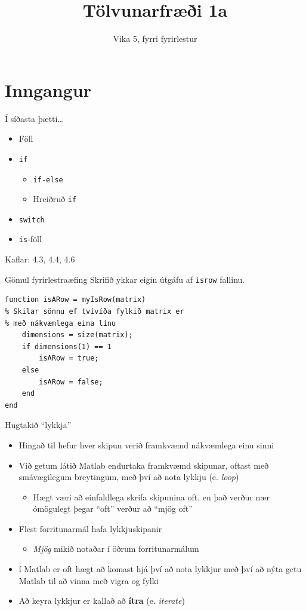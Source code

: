 \documentclass[handout]{beamer}
\title{Tölvunarfræði 1a}
\subtitle{Vika 5, fyrri fyrirlestur}
\begin{document}
\begin{frame}
\titlepage
\end{frame}

\section{Inngangur}

\begin{frame}{Í síðasta þætti\ldots}
\begin{itemize}
 \item Föll
 \item \texttt{if}
 \begin{itemize}
  \item \texttt{if-else}
  \item Hreiðruð \texttt{if}
 \end{itemize}
 \item \texttt{switch}
 \item \texttt{is}-föll
\end{itemize}
Kaflar: 4.3, 4.4, 4.6
\end{frame}

\begin{frame}[fragile]{Gömul fyrirlestraæfing}
Skrifið ykkar eigin útgáfu af \texttt{isrow} fallinu. \pause
\begin{verbatim}
function isARow = myIsRow(matrix)
% Skilar sönnu ef tvívíða fylkið matrix er 
% með nákvæmlega eina línu
    dimensions = size(matrix);
    if dimensions(1) == 1
        isARow = true;
    else
        isARow = false;
    end
end
\end{verbatim}

\end{frame}

\begin{frame}{Hugtakið ``lykkja''}
\begin{itemize}
 \item Hingað til hefur hver skipun verið framkvæmd nákvæmlega einu sinni
 \item Við getum látið Matlab endurtaka framkvæmd skipunar, oftast með smávægilegum breytingum, með því að nota lykkju (e. \emph{loop})
 \begin{itemize}
  \item Hægt væri að einfaldlega skrifa skipunina oft, en það verður nær ómögulegt þegar ``oft'' verður að ``mjög oft''
 \end{itemize}
 \item Flest forritunarmál hafa lykkjuskipanir
 \begin{itemize}
  \item \emph{Mjög} mikið notaðar í öðrum forritunarmálum
 \end{itemize}
 \item í Matlab er oft hægt að komast hjá því að nota lykkjur með því að nýta getu Matlab til að vinna með vigra og fylki
 \item Að keyra lykkjur er kallað að \textbf{ítra} (e. \emph{iterate})
\end{itemize}
\end{frame}
\end{document}
